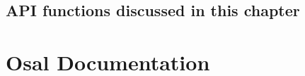 \documentclass[11pt,fleqn,hidelinks,oneside]{book} %
\newcommand{\ChapterFuncs}{}
\newenvironment{bottompar}{\par\vspace*{\fill}}{\clearpage}
\newcommand{\SpillChapterFuncs}%
{%
\section{API functions discussed in this chapter}
\ChapterFuncs{}%
\renewcommand{\ChapterFuncs}{}}
\newenvironment{NOTICE}
  {\par\begin{mdframed}[style=MyMdStyle,outerlinecolor=black,%
  						linecolor=black, outerlinewidth=1.5pt]%
    \begin{itemize}{}{\leftmargin=1cm
                   \labelwidth=\leftmargin}\item[\Large\Info]}
  {\end{itemize}\end{mdframed}\par}
\begin{document}
\SpillChapterFuncs



\appendix
\chapter{Osal Documentation}
\label{app:osal}



\cleardoublepage
\setlength{\columnsep}{0.75cm}
\printindex


\end{document}
